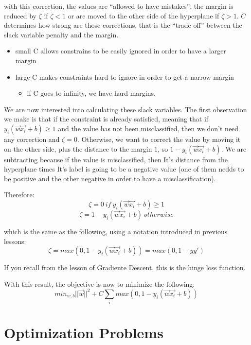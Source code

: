 \documentclass{article}
\begin{document}
with this correction, the values are ``allowed to have mistakes'', the
margin is reduced by \(\zeta\) if \(\zeta < 1\) or are moved to the
other side of the hyperplane if \(\zeta > 1\). \(C\) determines how
strong are those corrections, that is the ``trade off'' between the
slack variable penalty and the margin.

\begin{itemize}
\tightlist
\item
  small C allows constrains to be easily ignored in order to have a
  larger margin
\item
  large C makes constraints hard to ignore in order to get a narrow
  margin

  \begin{itemize}
  \tightlist
  \item
    if C goes to infinity, we have hard margins.
  \end{itemize}
\end{itemize}

We are now interested into calculating these slack variables. The first
observation we make is that if the constraint is already satisfied,
meaning that if \(y_i(\vec{w}\vec{x_i} + b) \ge 1\) and the value has
not been misclassified, then we don't need any correction and
\(\zeta = 0\). Otherwise, we want to correct the value by moving it on
the other side, plus the distance to the margin 1, so
\(1 - y_i(\vec{w}\vec{x_i}+b)\). We are subtracting because if the value
is misclassified, then It's distance from the hyperplane times It's
label is going to be a negative value (one of them nedds to be positive
and the other negative in order to have a misclassification).

Therefore: \[\zeta = 0\ if\ y_i(\vec{w}\vec{x_i}+b) \ge 1\]
\[\zeta = 1 - y_i(\vec{w}\vec{x_i}+b)\ otherwise\]

which is the same as the following, using a notation introduced in
previous lessons:
\[\zeta = max(0, 1-y_i(\vec{w}\vec{x_i}+b)) = max(0, 1-yy')\]

If you recall from the lesson of Gradiente Descent, this is the hinge
loss function.

With this result, the objective is now to minimize the following:
\[min_{w, b} ||\vec{w}||^2 + C \sum_i max(0, 1 - y_i(\vec{w}\vec{x_i} +b))\]

\section{Optimization Problems}\label{optimization-problems-1}
\end{document}
